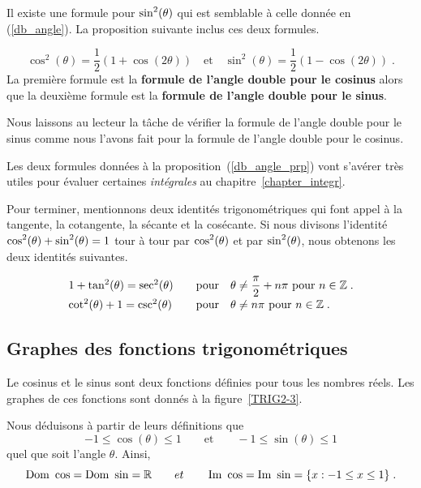 {Il existe une formule pour $\displaystyle \sin^2(\theta)$ qui est
semblable à celle donnée en (\ref{db_angle}).  La proposition suivante
inclus ces deux formules. 

\begin{prop}
\[
\cos^2(\theta) = \frac{1}{2} \left( 1 + \cos(2\theta) \right)
\quad \text{et} \quad 
\sin^2(\theta) = \frac{1}{2} \left( 1 - \cos(2\theta) \right) \; .
\]
La première formule est la {\bfseries formule de l'angle double pour
le cosinus} alors que la deuxième formule est la {\bfseries formule de
l'angle double pour le sinus}. \label{db_angle_prp}
\end{prop}

Nous laissons au lecteur la tâche de vérifier la formule de l'angle
double pour le sinus comme nous l'avons fait pour la formule de l'angle
double pour le cosinus.

\begin{rmk}
Les deux formules données à la proposition~(\ref{db_angle_prp}) vont
s'avérer très utiles pour évaluer certaines {\em intégrales} au
chapitre~\ref{chapter_integr}.
\end{rmk}

Pour terminer, mentionnons deux identités trigonométriques qui
font appel à la tangente, la cotangente, la sécante et la cosécante.
Si nous divisons l'identité $\displaystyle \cos^2(\theta) + \sin^2(\theta) = 1$ tour
à tour par $\displaystyle \cos^2(\theta)$ et par $\displaystyle \sin^2(\theta)$, nous obtenons les
deux identités suivantes.

\begin{prop}
\[
\begin{array}{ll}
1 + \tan^2(\theta) = \sec^2(\theta) &\quad \text{pour} \quad \theta \neq
\displaystyle \frac{\pi}{2} + n \pi \ \text{pour} \ n \in \mathbb{Z} \; . \\[0.5em]
\cot^2(\theta) + 1 = \csc^2(\theta) &\quad \text{pour} \quad \theta \neq
n \pi \ \text{pour} \ n \in \mathbb{Z} \; .
\end{array}
\]
\end{prop}

\subsection{Graphes des fonctions trigonométriques}

Le cosinus et le sinus sont deux fonctions définies pour tous les
nombres réels.  Les graphes de ces fonctions sont donnés à la
figure~\ref{TRIG2-3}.

Nous déduisons à partir de leurs définitions que
\[
-1 \leq \cos(\theta) \leq 1 \qquad \text{et} \qquad
-1 \leq \sin(\theta) \leq 1
\]
quel que soit l'angle $\theta$.   Ainsi,
\[
\DO \cos = \DO \sin = \RR \qquad et \qquad
\IM \cos = \IM \sin = \{ x : -1 \leq x \leq 1 \} \; .
\]

}
